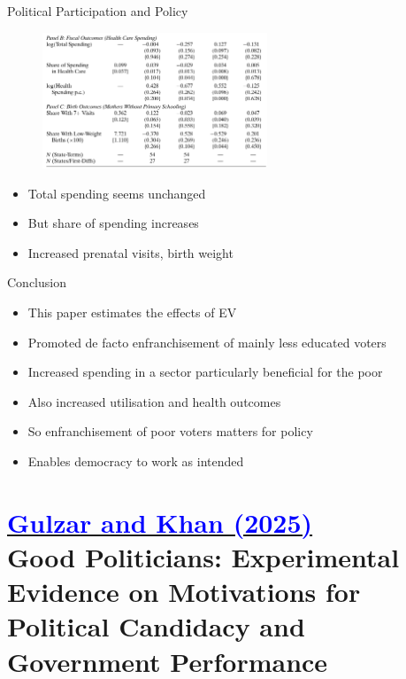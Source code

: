 \documentclass[11pt,notes=hide,aspectratio=169,mathserif]{beamer}
\begin{document}
\begin{frame}{Political Participation and Policy}
\begin{figure}
\centering
\includegraphics[width=0.6\textwidth]{inputs/fig8.png}
\end{figure}
\begin{itemize}
\pause \item Total spending seems unchanged
\pause \item But share of spending increases 
\pause \item Increased prenatal visits, birth weight
\end{itemize}
\end{frame}

\begin{frame}{Conclusion}
\begin{itemize}
\item This paper estimates the effects of EV 
\pause \item Promoted de facto enfranchisement of mainly less educated voters
\pause \item Increased spending in a sector particularly beneficial for the poor
\pause \item Also increased utilisation and health outcomes 
\pause \item So enfranchisement of poor voters matters for policy 
\pause \item Enables democracy to work as intended
\end{itemize}
\end{frame}

\section*{\href{https://academic.oup.com/restud/article/92/1/339/7627149}{\textcolor{blue}{Gulzar and Khan (2025)}} \\[5mm] 
\textnormal{\small{Good Politicians: Experimental Evidence on Motivations for Political Candidacy and Government Performance}}}
\end{document}
